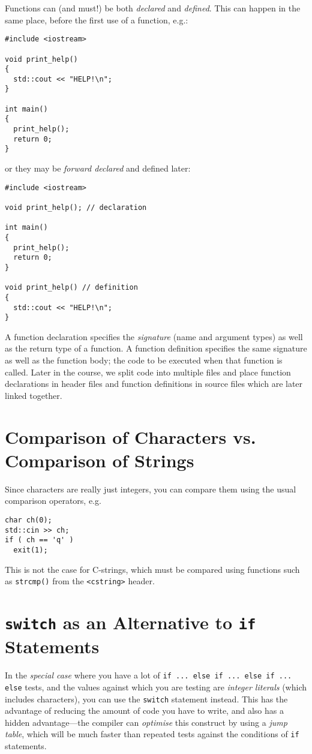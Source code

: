 \documentclass[a4paper]{scrartcl}
\begin{document}
Functions can (and must!) be both \emph{declared} and \emph{defined}. This can happen in the same place, before the first use of a function, e.g.:
\begin{verbatim}
#include <iostream>

void print_help()
{
  std::cout << "HELP!\n";
}

int main()
{
  print_help();
  return 0;
}
\end{verbatim}

or they may be \emph{forward declared} and defined later:
\begin{verbatim}
#include <iostream>

void print_help(); // declaration

int main()
{
  print_help();
  return 0;
}

void print_help() // definition
{
  std::cout << "HELP!\n";
}
\end{verbatim}

A function declaration specifies the \emph{signature} (name and argument types) as well as the return type of a function. A function definition specifies the same signature as well as the function body; the code to be executed when that function is called. Later in the course, we split code into multiple files and place function declarations in header files and function definitions in source files which are later linked together.

\section{Comparison of Characters vs. Comparison of Strings}
Since characters are really just integers, you can compare them using the usual comparison operators, e.g.
\begin{verbatim}
char ch(0);
std::cin >> ch;
if ( ch == 'q' )
  exit(1);
\end{verbatim}

This is not the case for C-strings, which must be compared using functions such as \texttt{strcmp()} from the \texttt{<cstring>} header.

\section{\texttt{switch} as an Alternative to \texttt{if} Statements}
In the \emph{special case} where you have a lot of \texttt{if ... else if ... else if ... else} tests, and the values against which you are testing are \emph{integer literals} (which includes characters), you can use the \texttt{switch} statement instead. This has the advantage of reducing the amount of code you have to write, and also has a hidden advantage---the compiler can \emph{optimise} this construct by using a \emph{jump table}, which will be much faster than repeated tests against the conditions of \texttt{if} statements.
\end{document}
